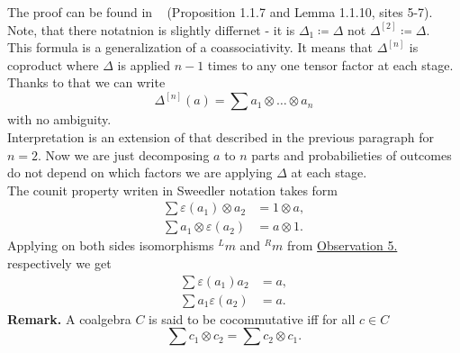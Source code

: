 \documentclass[a4paper, 12pt]{report}
\begin{document}
The proof can be found in ~\cite{DNR} (Proposition 1.1.7 and Lemma 1.1.10, sites 5-7). Note, that there
notatnion is slightly differnet - it is $\Delta_1 \coloneqq \Delta$ not $\Delta^{[2]} \coloneqq \Delta$. \\
This formula is a generalization of a coassociativity. It means that $\Delta^{[n]}$ is coproduct where 
$\Delta$ is applied $n-1$ times to any one tensor factor at each stage. Thanks to that we can write
\begin{equation*}
\Delta^{[n]}(a) = \sum a_1 \otimes \dots \otimes a_n
\end{equation*}
with no ambiguity. \\
Interpretation is an extension of that described in the previous paragraph for $n = 2$. Now we are just
decomposing $a$ to $n$ parts and probabilieties of outcomes do not depend on which factors we are
applying $\Delta$ at each stage.  \\[8pt]
The counit property writen in Sweedler notation takes form
\begin{align*}
\sum\varepsilon(a_1) \otimes a_2 &= 1 \otimes a, \\
\sum a_1 \otimes \varepsilon(a_2) &= a \otimes 1.
\end{align*}
Applying on both sides isomorphisms ${^Lm}$ and ${^Rm}$ from
\hyperref[observation:5]{Observation 5.} respectively we get
\begin{align*}
\sum\varepsilon(a_1)a_2 &= a, \\
\sum a_1\varepsilon(a_2) &= a.
\end{align*}
\textbf{Remark. } A coalgebra $C$ is said to be cocommutative iff for all $c \in C$
\begin{equation*}
\sum c_1 \otimes c_2 = \sum c_2 \otimes c_1.
\end{equation*}
\end{document}
